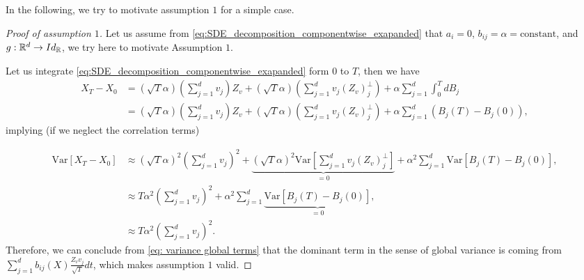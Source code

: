 In the following, we try to motivate assumption $1$ for a simple case.
\begin{proof}[Proof of assumption $1$]
Let us assume from \eqref{eq:SDE_decomposition_componentwise_exapanded} that $a_i=0$, $b_{ij}=\alpha=\text{constant}$, and $g:\mathbb{R}^d \rightarrow Id_{\mathbb{R}}$, we try here to motivate Assumption $1$.

Let us integrate \eqref{eq:SDE_decomposition_componentwise_exapanded} form $0$ to $T$, then we have
\begin{align*}
X_T-X_0 &= \left( \sqrt{T}\alpha \right) \left( \sum_{j=1}^d v_j \right) Z_v + \left( \sqrt{T} \alpha \right) \left( \sum_{j=1}^d v_j  (Z_v)^\perp_j \right)+\alpha \sum_{j=1}^d  \int_{0}^T dB_j \nonumber\\
&= \left( \sqrt{T}\alpha \right) \left( \sum_{j=1}^d v_j \right) Z_v + \left( \sqrt{T} \alpha \right) \left( \sum_{j=1}^d v_j  (Z_v)^\perp_j \right)+\alpha \sum_{j=1}^d  \left(B_j(T)-B_j(0)\right) ,
\end{align*}
implying (if we neglect the correlation terms)

\begin{align}\label{eq: variance global terms}
\text{Var}[X_T-X_0] &\approx \left( \sqrt{T}\alpha \right)^2 \left( \sum_{j=1}^d v_j \right)^2  + \underset{=0}{\underbrace{\left( \sqrt{T} \alpha \right)^2  \text{Var}\left[ \sum_{j=1}^d v_j  (Z_v)^\perp_j \right]}}+ \alpha^2 \sum_{j=1}^d \text{Var} \left[B_j(T)-B_j(0)\right],\nonumber\\
& \approx  T \alpha^2 \left( \sum_{j=1}^d v_j \right)^2  + \alpha^2 \sum_{j=1}^d \underset{=0}{\underbrace{\text{Var} \left[B_j(T)-B_j(0)\right]}},\nonumber\\
& \approx  T \alpha^2 \left( \sum_{j=1}^d v_j \right)^2.
\end{align}
Therefore, we can conclude from \eqref{eq: variance global terms} that the dominant term in the sense of global variance is coming from $\sum_{j=1}^d b_{ij}(X)  \frac{Z_v v_j}{\sqrt{T}} dt$, which makes assumption $1$  valid.
\end{proof}

